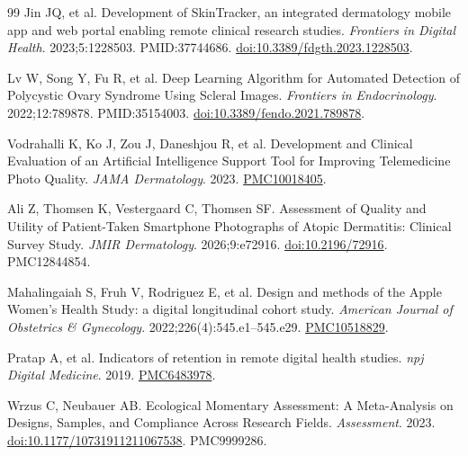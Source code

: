 \documentclass[11pt,a4paper]{article}
\begin{document}
\begin{thebibliography}{99}
 Jin JQ, et al. Development of SkinTracker, an integrated dermatology mobile app and web portal enabling remote clinical research studies. \emph{Frontiers in Digital Health}. 2023;5:1228503. PMID:37744686. \href{https://doi.org/10.3389/fdgth.2023.1228503}{doi:10.3389/fdgth.2023.1228503}.

 Lv W, Song Y, Fu R, et al. Deep Learning Algorithm for Automated Detection of Polycystic Ovary Syndrome Using Scleral Images. \emph{Frontiers in Endocrinology}. 2022;12:789878. PMID:35154003. \href{https://doi.org/10.3389/fendo.2021.789878}{doi:10.3389/fendo.2021.789878}.

 Vodrahalli K, Ko J, Zou J, Daneshjou R, et al. Development and Clinical Evaluation of an Artificial Intelligence Support Tool for Improving Telemedicine Photo Quality. \emph{JAMA Dermatology}. 2023. \href{https://pmc.ncbi.nlm.nih.gov/articles/PMC10018405/}{PMC10018405}.

 Ali Z, Thomsen K, Vestergaard C, Thomsen SF. Assessment of Quality and Utility of Patient-Taken Smartphone Photographs of Atopic Dermatitis: Clinical Survey Study. \emph{JMIR Dermatology}. 2026;9:e72916. \href{https://doi.org/10.2196/72916}{doi:10.2196/72916}. PMC12844854.

 Mahalingaiah S, Fruh V, Rodriguez E, et al. Design and methods of the Apple Women's Health Study: a digital longitudinal cohort study. \emph{American Journal of Obstetrics \& Gynecology}. 2022;226(4):545.e1--545.e29. \href{https://pmc.ncbi.nlm.nih.gov/articles/PMC10518829/}{PMC10518829}.

 Pratap A, et al. Indicators of retention in remote digital health studies. \emph{npj Digital Medicine}. 2019. \href{https://pmc.ncbi.nlm.nih.gov/articles/PMC6483978/}{PMC6483978}.

 Wrzus C, Neubauer AB. Ecological Momentary Assessment: A Meta-Analysis on Designs, Samples, and Compliance Across Research Fields. \emph{Assessment}. 2023. \href{https://doi.org/10.1177/10731911211067538}{doi:10.1177/10731911211067538}. PMC9999286.

\end{thebibliography}
\end{document}
